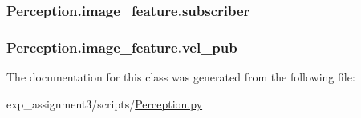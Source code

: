 \subsubsection[{\texorpdfstring{subscriber}{subscriber}}]{\setlength{\rightskip}{0pt plus 5cm}Perception.\+image\+\_\+feature.\+subscriber}\hypertarget{classPerception_1_1image__feature_a73606194793aca7799100ae95535b072}{}\label{classPerception_1_1image__feature_a73606194793aca7799100ae95535b072}
\subsubsection[{\texorpdfstring{vel\+\_\+pub}{vel_pub}}]{\setlength{\rightskip}{0pt plus 5cm}Perception.\+image\+\_\+feature.\+vel\+\_\+pub}\hypertarget{classPerception_1_1image__feature_a2582bcb9aca24ef19e5a249684048c84}{}\label{classPerception_1_1image__feature_a2582bcb9aca24ef19e5a249684048c84}


The documentation for this class was generated from the following file\+:\begin{DoxyCompactItemize}
\item 
exp\+\_\+assignment3/scripts/\hyperlink{Perception_8py}{Perception.\+py}\end{DoxyCompactItemize}
